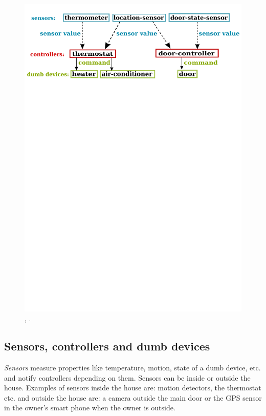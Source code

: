 \documentclass{article}
\begin{document}
\begin{figure}
\begin{center}
\includegraphics[scale=0.4, trim= 0 600 0 0]{figure1.pdf}
\caption{\color{RoyalBlue}{Sensors}, \color{Maroon}{controllers,} \color{black}{and} \color{LimeGreen}{dumb devices}. %
}
\label{fig:arch}
\end{center}
\end{figure}

\subsection{Sensors, controllers and dumb devices}
\label{subsec:devices}
\textit{Sensors} measure properties like temperature, motion, state of a dumb device, etc. and notify controllers depending on them. Sensors can be inside or outside the house. Examples of sensors inside the house are: motion detectors, the thermostat etc. and outside the house are: a camera outside the main door or the GPS sensor in the owner's smart phone when the owner is outside. 
\end{document}
